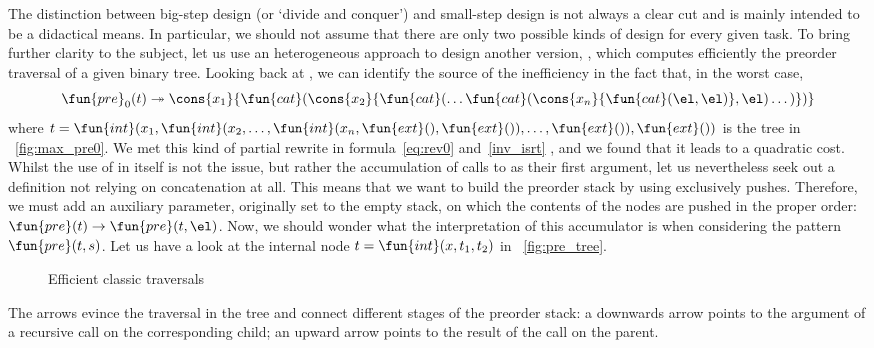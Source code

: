 The distinction between big\hyp{}step design (or `divide and conquer') and
small\hyp{}step design is not always a
clear cut and is mainly intended to be a didactical means. In
particular, we should not assume that there are only two possible
kinds of design for every given task. To bring further clarity to the
subject, let us use an heterogeneous approach to design another
version, , which computes
efficiently the preorder traversal of a given binary tree. Looking
back at , we can
identify the source of the inefficiency in the fact that, in the worst
case,
\begin{equation*}
\fun{pre}_0(t) \twoheadrightarrow
\cons{x_1}{\fun{cat}(\cons{x_2}{\fun{cat}(\dots
    \fun{cat}(\cons{x_n}{\fun{cat}(\el, \el)},\el) \dots)})}
\index{cat@\fun{cat/2}}
\end{equation*}
where \(t = \fun{int}(x_1,\fun{int}(x_2,\dots, \fun{int}(x_n,
\fun{ext}(), \fun{ext}()), \dots, \fun{ext}()),\fun{ext}())\) is the
tree in \fig~\vref{fig:max_pre0}. We met this kind of partial rewrite
in formula~\eqref{eq:rev0}
 and~\eqref{inv_isrt}
,
and we found that it leads to a quadratic cost.  Whilst the use of
 in itself is not the issue, but
rather the accumulation of calls to 
as their first argument, let us nevertheless seek out a definition not
relying on concatenation at all. This means that we want to build the
preorder stack by using exclusively pushes. Therefore, we must add an
auxiliary parameter, originally set to the empty stack, on which the
contents of the nodes are pushed in the proper order: \(\fun{pre}(t)
\rightarrow \fun{pre}(t,\el)\). Now, we should
wonder what the interpretation of this accumulator is when considering the pattern
\(\fun{pre}(t,s)\). Let us have a look at the internal node
\(t=\fun{int}(x,t_1,t_2)\) in \fig~\vref{fig:pre_tree}.
\begin{figure}
\centering
{}
\caption{Efficient classic traversals}
\label{fig:classic_walks}
\end{figure}
The arrows evince the traversal in the tree and connect different
stages of the preorder stack: a downwards arrow points to the argument
of a recursive call on the corresponding child; an upward arrow points
to the result of the call on the parent.

